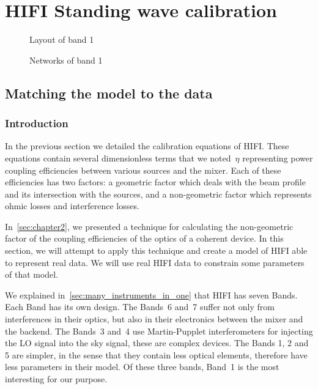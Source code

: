 \cleardoublepage
\chapter{HIFI Standing wave calibration}
\label{sec:chapter4}


\begin{figure}
    \centering
    \footnotesize
    
    \caption{Layout of band 1}
    \label{fig:band1_layout}
\end{figure}

\begin{figure}
    \centering
    \footnotesize
    
    \caption{Networks of band 1}
    \label{fig:band1_networks}
\end{figure}


\section{Matching the model to the data}
\label{sec:matching_the_model_to_the_data}

\subsection{Introduction}
\label{sec:matching_model_data_intro}
In the previous section we detailed the calibration equations of HIFI.
These equations contain several dimensionless terms that we noted~$\eta$ representing power coupling efficiencies between various sources and the mixer.
Each of these efficiencies has two factors: a geometric factor which deals with the beam profile and its intersection with the sources, and a non-geometric factor which represents ohmic losses and interference losses.

In~\cref{sec:chapter2}, we presented a technique for calculating the non-geometric factor of the coupling efficiencies of the optics of a coherent device.
In this section, we will attempt to apply this technique and create a model of HIFI able to represent real data.
We will use real HIFI data to constrain some parameters of that model.

We explained in~\vref{sec:many_instruments_in_one} that HIFI has seven Bands.
Each Band has its own design.
The Bands~6 and~7 suffer not only from interferences in their optics, but also in their electronics between the mixer and the backend.
The Bands~3 and~4 use Martin-Pupplet interferometers for injecting the LO signal into the sky signal, these are complex devices.
The Bands 1, 2 and 5 are simpler, in the sense that they contain less optical elements, therefore have less parameters in their model.
Of these three bands, Band~1 is the most interesting for our purpose.

